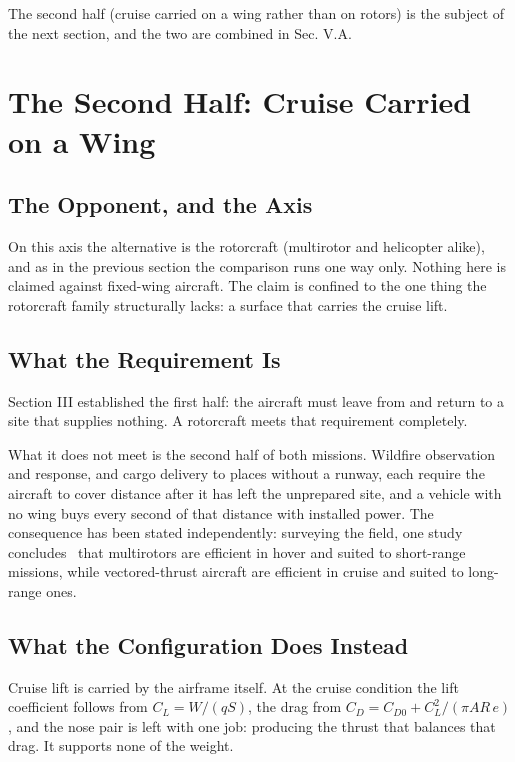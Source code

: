 \documentclass[journal]{new-aiaa}
\begin{document}
The second half (cruise carried on a wing rather than on rotors) is the subject of the next section, and the two are combined in Sec. V.A.

\section{The Second Half: Cruise Carried on a Wing}

\subsection{The Opponent, and the Axis}

On this axis the alternative is the rotorcraft (multirotor and helicopter alike), and as in the previous section the comparison runs one way only. Nothing here is claimed against fixed-wing aircraft. The claim is confined to the one thing the rotorcraft family structurally lacks: a surface that carries the cruise lift.

\subsection{What the Requirement Is}

Section III established the first half: the aircraft must leave from and return to a site that supplies nothing. A rotorcraft meets that requirement completely.

What it does not meet is the second half of both missions. Wildfire observation and response, and cargo delivery to places without a runway, each require the aircraft to cover distance after it has left the unprepared site, and a vehicle with no wing buys every second of that distance with installed power. The consequence has been stated independently: surveying the field, one study concludes~\cite{r18} that multirotors are efficient in hover and suited to short-range missions, while vectored-thrust aircraft are efficient in cruise and suited to long-range ones.

\subsection{What the Configuration Does Instead}

Cruise lift is carried by the airframe itself. At the cruise condition the lift coefficient follows from $C_L = W/(qS)$, the drag from $C_D = C_{D0} + C_L^2/(\pi A\!R\,e)$, and the nose pair is left with one job: producing the thrust that balances that drag. It supports none of the weight.
\end{document}
